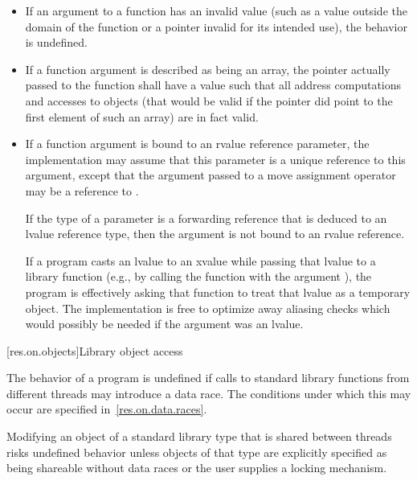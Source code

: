 \begin{itemize}
\item
If an argument to a function has an invalid value (such
%
as a value outside the domain of the function or a pointer invalid for its
intended use), the behavior is undefined.
%

\item
If a function argument is described as being an array,
%
the pointer actually passed to the function shall have a value such that all
address computations and accesses to objects (that would be valid if the
pointer did point to the first element of such an array) are in fact valid.

\item
If a function argument is bound to an rvalue reference parameter, the implementation may
assume that this parameter is a unique reference to this argument,
except that the argument passed to a move assignment operator may be
a reference to .
\begin{note}
If the type of a parameter is a forwarding reference
that is deduced to an lvalue reference type, then
the argument is not bound to an rvalue reference.
\end{note}
\begin{note}
If a program casts
an lvalue to an xvalue while passing that lvalue to a library function
(e.g., by calling the function with the argument ), the program
is effectively asking that function to treat that lvalue as a temporary object.
The implementation
is free to optimize away aliasing checks which would possibly be needed if the argument was
an lvalue.
\end{note}
\end{itemize}

[res.on.objects]{Library object access}

\pnum
The behavior of a program is undefined if calls to standard library functions from different
threads may introduce a data race. The conditions under which this may occur are specified
in~\ref{res.on.data.races}.
\begin{note}
Modifying an object of a standard library type that is
shared between threads risks undefined behavior unless objects of that type are explicitly
specified as being shareable without data races or the user supplies a locking mechanism.
\end{note}

